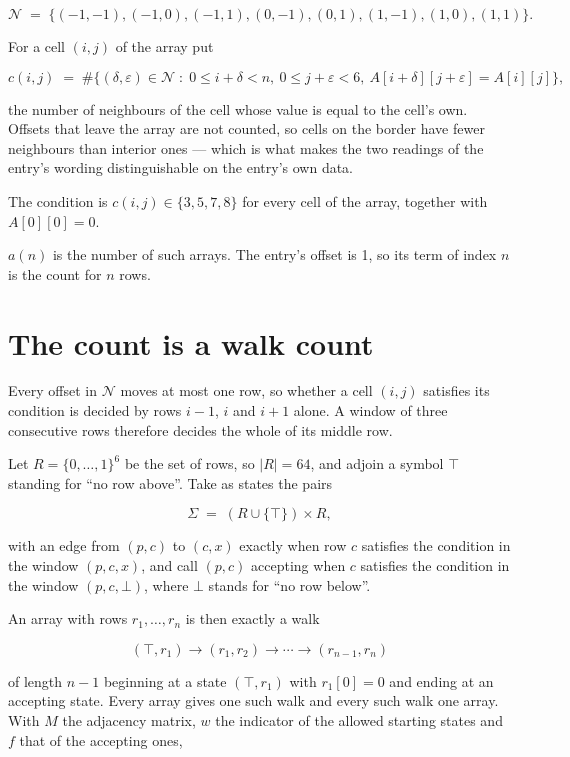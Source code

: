 \documentclass[11pt]{article}
\theoremstyle{definition}
\begin{document}
\[\mathcal{N} \;=\; \{(-1,-1), (-1,0), (-1,1), (0,-1), (0,1), (1,-1), (1,0), (1,1)\}.\]

For a cell $(i,j)$ of the array put

\[c(i,j) \;=\; \#\bigl\{(\delta,\varepsilon)\in\mathcal{N} \;:\; 0\le i+\delta<n,\ 0\le j+\varepsilon<6,\ A[i+\delta][j+\varepsilon] = A[i][j]\bigr\},\]

the number of neighbours of the cell whose value is equal to the cell's own. Offsets that leave the array are not counted, so cells on the border have fewer neighbours than interior ones --- which is what makes the two readings of the entry's wording distinguishable on the entry's own data.

The condition is $c(i,j) \in \{3, 5, 7, 8\}$ for every cell of the array, together with $A[0][0]=0$.

$a(n)$ is the number of such arrays. The entry's offset is 1, so its term of index $n$ is the count for $n$ rows.

\section{The count is a walk count}

Every offset in $\mathcal{N}$ moves at most one row, so whether a cell $(i,j)$ satisfies its condition is decided by rows $i-1$, $i$ and $i+1$ alone. A window of three consecutive rows therefore decides the whole of its middle row.

Let $R = \{0,\dots,1\}^{6}$ be the set of rows, so $|R| = 64$, and adjoin a symbol $\top$ standing for ``no row above''. Take as states the pairs

\[\Sigma \;=\; (R \cup \{\top\}) \times R,\]

with an edge from $(p,c)$ to $(c,x)$ exactly when row $c$ satisfies the condition in the window $(p,c,x)$, and call $(p,c)$ accepting when $c$ satisfies the condition in the window $(p,c,\bot)$, where $\bot$ stands for ``no row below''.

An array with rows $r_1,\dots,r_n$ is then exactly a walk

\[(\top,r_1) \to (r_1,r_2) \to \cdots \to (r_{n-1},r_n)\]

of length $n-1$ beginning at a state $(\top,r_1)$ with $r_1[0]=0$ and ending at an accepting state. Every array gives one such walk and every such walk one array. With $M$ the adjacency matrix, $w$ the indicator of the allowed starting states and $f$ that of the accepting ones,
\end{document}
